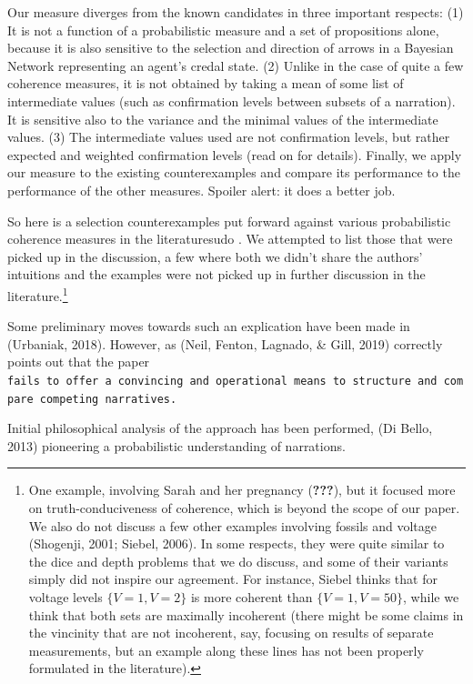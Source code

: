 \documentclass[11pt,dvipsnames,enabledeprecatedfontcommands]{scrartcl}
\begin{document}
Our measure diverges from the known candidates in three important
respects: (1) It is not a function of a probabilistic measure and a set
of propositions alone, because it is also sensitive to the selection and
direction of arrows in a Bayesian Network representing an agent's credal
state. (2) Unlike in the case of quite a few coherence measures, it is
not obtained by taking a mean of some list of intermediate values (such
as confirmation levels between subsets of a narration). It is sensitive
also to the variance and the minimal values of the intermediate values.
(3) The intermediate values used are not confirmation levels, but rather
expected and weighted confirmation levels (read on for details).
Finally, we apply our measure to the existing counterexamples and
compare its performance to the performance of the other measures.
Spoiler alert: it does a better job.

So here is a selection counterexamples put forward against various
probabilistic coherence measures in the literaturesudo . We attempted to
list those that were picked up in the discussion, a few where both we
didn't share the authors' intuitions and the examples were not picked up
in further discussion in the literature.\footnote{One example, involving
  Sarah and her pregnancy ({\textbf{???}}), but it focused more on
  truth-conduciveness of coherence, which is beyond the scope of our
  paper. We also do not discuss a few other examples involving fossils
  and voltage (Shogenji, 2001; Siebel, 2006). In some respects, they
  were quite similar to the dice and depth problems that we do discuss,
  and some of their variants simply did not inspire our agreement. For
  instance, Siebel thinks that for voltage levels \(\{V=1, V=2\}\) is
  more coherent than \(\{V=1, V=50\}\), while we think that both sets
  are maximally incoherent (there might be some claims in the vincinity
  that are not incoherent, say, focusing on results of separate
  measurements, but an example along these lines has not been properly
  formulated in the literature).}

Some preliminary moves towards such an explication have been made in
(Urbaniak, 2018). However, as (Neil, Fenton, Lagnado, \& Gill, 2019)
correctly points out that the paper
\texttt{fails\ to\ offer\ a\ convincing\ and\ operational\ means\ to\ structure\ and\ compare\ competing\ narratives.}

Initial philosophical analysis of the approach has been performed, (Di
Bello, 2013) pioneering a probabilistic understanding of narrations.
\end{document}
